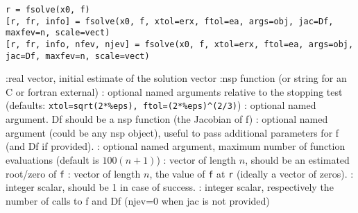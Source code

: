 
\begin{mandesc}
\end{mandesc}

\begin{calling_sequence}
\begin{verbatim}
r = fsolve(x0, f)
[r, fr, info] = fsolve(x0, f, xtol=erx, ftol=ea, args=obj, jac=Df, maxfev=n, scale=vect) 
[r, fr, info, nfev, njev] = fsolve(x0, f, xtol=erx, ftol=ea, args=obj, jac=Df, maxfev=n, scale=vect) 
\end{verbatim}
\end{calling_sequence}
\begin{parameters}
  \begin{varlist}
    :real vector, initial estimate of the solution vector
    :nsp function (or string for an C or fortran external)
    : optional named arguments relative to the stopping test (defaults:
    \verb+xtol=sqrt(2*%eps), ftol=(2*%eps)^(2/3)+)
    : optional named argument. Df should be a nsp function (the Jacobian of f)
    : optional named argument (could be any nsp object), useful to pass additional parameters for f (and
    Df if provided).
    : optional named argument, maximum number of function evaluations (default is $100(n+1)$)
    : vector of length $n$, should be an estimated root/zero of \verb+f+ 
    : vector of length $n$, the value of \verb+f+  at \verb+r+ (ideally a vector of zeros).
    : integer scalar, should be 1 in case of success.
    : integer scalar, respectively the number of calls to f and Df (njev=0 when jac is not provided)
  \end{varlist}
\end{parameters}

